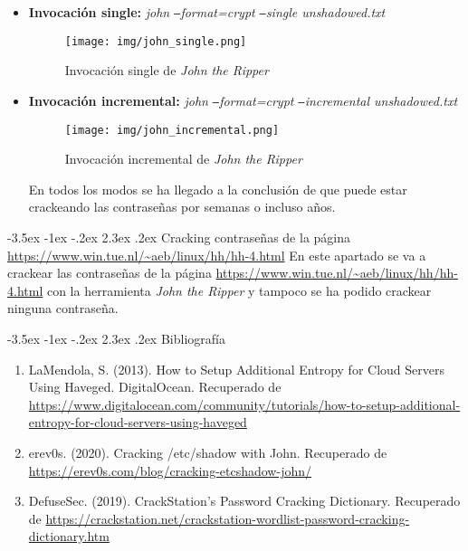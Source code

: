 \documentclass[11pt]{report}
\makeatletter
\renewcommand\chapter{\@startsection{chapter}{0}{\z@}%
    {-3.5ex \@plus -1ex \@minus -.2ex}%
    {2.3ex \@plus.2ex}%
    {\normalfont\Large\bfseries}}
\makeatother
\begin{document}
\begin{itemize}
  \item \textbf{Invocación single:} \emph{john \texttt{--}format=crypt \texttt{--}single unshadowed.txt}
  \begin{figure}[H]
    \centering
    \texttt{[image: img/john\_single.png]}
    \caption{Invocación single de \emph{John the Ripper}}
    \label{fig:invocación single de john the ripper}
  \end{figure}

  \item \textbf{Invocación incremental:} \emph{john \texttt{--}format=crypt \texttt{--}incremental unshadowed.txt}
  \begin{figure}[H]
    \centering
    \texttt{[image: img/john\_incremental.png]}
    \caption{Invocación incremental de \emph{John the Ripper}}
    \label{fig:invocación incremental de john the ripper}
  \end{figure}
  
  En todos los modos se ha llegado a la conclusión de que puede estar crackeando las contraseñas por semanas o incluso años.
\end{itemize}

\cleardoublepage
\chapter{Cracking contraseñas de la página \url{https://www.win.tue.nl/~aeb/linux/hh/hh-4.html}}
En este apartado se va a crackear las contraseñas de la página \url{https://www.win.tue.nl/~aeb/linux/hh/hh-4.html}
con la herramienta \emph{John the Ripper} y tampoco se ha podido crackear ninguna contraseña.

\cleardoublepage

\chapter{Bibliografía} %
\begin{enumerate}
\item LaMendola, S. (2013). How to Setup Additional Entropy for Cloud Servers Using Haveged. DigitalOcean. Recuperado de \url{https://www.digitalocean.com/community/tutorials/how-to-setup-additional-entropy-for-cloud-servers-using-haveged}
\item erev0s. (2020). Cracking /etc/shadow with John. Recuperado de \url{https://erev0s.com/blog/cracking-etcshadow-john/}  
\item DefuseSec. (2019). CrackStation's Password Cracking Dictionary. Recuperado de \url{https://crackstation.net/crackstation-wordlist-password-cracking-dictionary.htm}
\end{enumerate}
\end{document}
